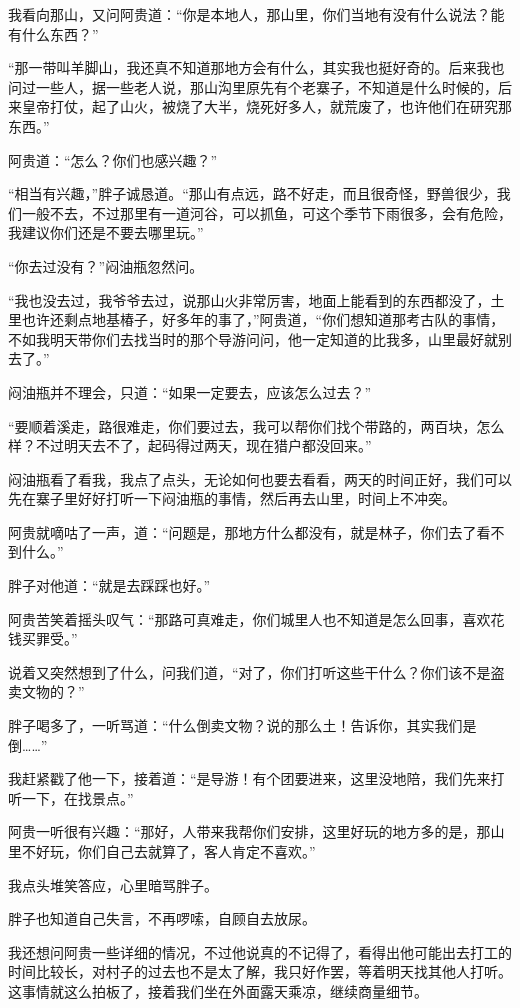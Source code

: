 我看向那山，又问阿贵道：“你是本地人，那山里，你们当地有没有什么说法？能有什么东西？”

“那一带叫羊脚山，我还真不知道那地方会有什么，其实我也挺好奇的。后来我也问过一些人，据一些老人说，那山沟里原先有个老寨子，不知道是什么时候的，后来皇帝打仗，起了山火，被烧了大半，烧死好多人，就荒废了，也许他们在研究那东西。”

阿贵道：“怎么？你们也感兴趣？”

“相当有兴趣，”胖子诚恳道。“那山有点远，路不好走，而且很奇怪，野兽很少，我们一般不去，不过那里有一道河谷，可以抓鱼，可这个季节下雨很多，会有危险，我建议你们还是不要去哪里玩。”

“你去过没有？”闷油瓶忽然问。

“我也没去过，我爷爷去过，说那山火非常厉害，地面上能看到的东西都没了，土里也许还剩点地基椿子，好多年的事了，”阿贵道，“你们想知道那考古队的事情，不如我明天带你们去找当时的那个导游问问，他一定知道的比我多，山里最好就别去了。”

闷油瓶并不理会，只道：“如果一定要去，应该怎么过去？”

“要顺着溪走，路很难走，你们要过去，我可以帮你们找个带路的，两百块，怎么样？不过明天去不了，起码得过两天，现在猎户都没回来。”

闷油瓶看了看我，我点了点头，无论如何也要去看看，两天的时间正好，我们可以先在寨子里好好打听一下闷油瓶的事情，然后再去山里，时间上不冲突。

阿贵就嘀咕了一声，道：“问题是，那地方什么都没有，就是林子，你们去了看不到什么。”

胖子对他道：“就是去踩踩也好。”

阿贵苦笑着摇头叹气：“那路可真难走，你们城里人也不知道是怎么回事，喜欢花钱买罪受。”

说着又突然想到了什么，问我们道，“对了，你们打听这些干什么？你们该不是盗卖文物的？”

胖子喝多了，一听骂道：“什么倒卖文物？说的那么土！告诉你，其实我们是倒……”

我赶紧戳了他一下，接着道：“是导游！有个团要进来，这里没地陪，我们先来打听一下，在找景点。”

阿贵一听很有兴趣：“那好，人带来我帮你们安排，这里好玩的地方多的是，那山里不好玩，你们自己去就算了，客人肯定不喜欢。”

我点头堆笑答应，心里暗骂胖子。

胖子也知道自己失言，不再啰嗦，自顾自去放尿。

我还想问阿贵一些详细的情况，不过他说真的不记得了，看得出他可能出去打工的时间比较长，对村子的过去也不是太了解，我只好作罢，等着明天找其他人打听。这事情就这么拍板了，接着我们坐在外面露天乘凉，继续商量细节。

